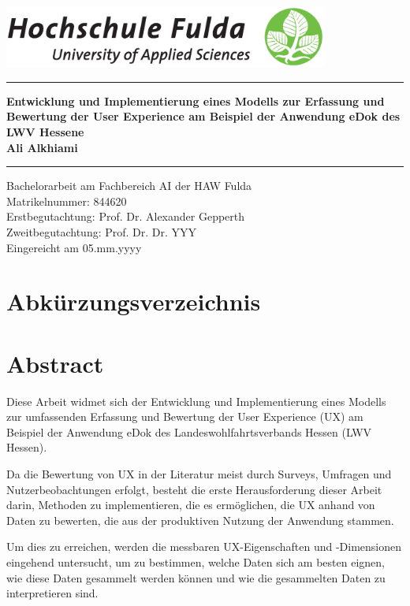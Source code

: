 \documentclass[12pt,oneside]{article}
\newcommand{\HSFTitle}[8]{

  \thispagestyle{empty}
\begin{center}
    \includegraphics[width=0.8\textwidth]{logo.eps} \\
    \vspace*{\stretch{1}}
    \end{center}

  {\parindent0cm
  \rule{\linewidth}{.7ex}}
  \begin{center}
    \vspace*{\stretch{1}}
    \sffamily\bfseries\Huge
    #1\\
    \vspace*{\stretch{1}}
    \sffamily\bfseries\large
    #3
    \vspace*{\stretch{1}}
  \end{center}
  \rule{\linewidth}{.7ex}

  \vspace*{\stretch{2}}
  \begin{center}
    \Large #2 am #5 der HAW Fulda \\
    \vspace*{\stretch{1}} 
    \large Matrikelnummer:  #4 \\[1mm]
    \large Erstbegutachtung:  #7 \\[1mm]
    \large Zweitbegutachtung:  #8 \\[1mm]
    \vspace*{\stretch{1}}
    \large Eingereicht am #6
  \end{center}
}
\begin{document}
 
 

 \HSFTitle
      {Entwicklung und Implementierung eines Modells zur Erfassung und Bewertung der User Experience am Beispiel der Anwendung eDok des LWV Hessene }        %
      {Bachelorarbeit} %
      {Ali Alkhiami}          %
      {844620}
      {Fachbereich AI}  %
      {05.mm.yyyy}        %
      {Prof. Dr. Alexander Gepperth}     %
      {Prof. Dr. Dr. YYY}    %

  \clearpage

\lhead{}
    \setcounter{page}{1}
\tableofcontents
\section{Abkürzungsverzeichnis}
\begin{acronym}[hyperlinks]
\end{acronym}
\section{Abstract}
  Diese Arbeit widmet sich der Entwicklung und Implementierung eines Modells zur umfassenden Erfassung und Bewertung der User Experience (UX) am Beispiel der Anwendung eDok des Landeswohlfahrtsverbands Hessen (LWV Hessen).

Da die Bewertung von UX in der Literatur meist durch Surveys, Umfragen und Nutzerbeobachtungen erfolgt, besteht die erste Herausforderung dieser Arbeit darin, Methoden zu implementieren, die es ermöglichen, die UX anhand von Daten zu bewerten, die aus der produktiven Nutzung der Anwendung stammen.

Um dies zu erreichen, werden die messbaren UX-Eigenschaften und -Dimensionen eingehend untersucht, um zu bestimmen, welche Daten sich am besten eignen, wie diese Daten gesammelt werden können und wie die gesammelten Daten zu interpretieren sind.
\end{document}
